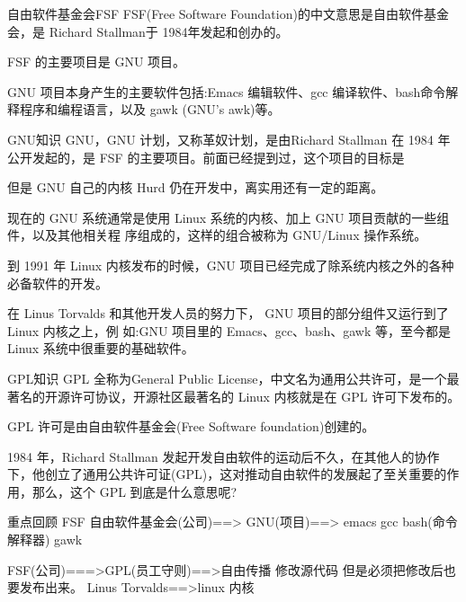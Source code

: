 \begin{ascboxD}{自由软件基金会FSF}
	FSF(Free Software Foundation)的中文意思是自由软件基金会，是 Richard Stallman于 1984年发起和创办的。
	
	FSF 的主要项目是 GNU 项目。
	
	GNU 项目本身产生的主要软件包括:Emacs 编辑软件、gcc 编译软件、bash命令解释程序和编程语言，以及 gawk (GNU’s awk)等。
\end{ascboxD}

\begin{ascboxD}{GNU知识}
	GNU，GNU 计划，又称革奴计划，是由Richard Stallman 在 1984 年公开发起的，是 FSF 的主要项目。前面已经提到过，这个项目的目标是
	
	但是 GNU 自己的内核 Hurd 仍在开发中，离实用还有一定的距离。
	
	现在的 GNU 系统通常是使用 Linux 系统的内核、加上 GNU 项目贡献的一些组件，以及其他相关程 序组成的，这样的组合被称为 GNU/Linux 操作系统。
	
	到 1991 年 Linux 内核发布的时候，GNU 项目已经完成了除系统内核之外的各种必备软件的开发。
	
	在 Linus Torvalds 和其他开发人员的努力下， GNU 项目的部分组件又运行到了 Linux 内核之上，例 如:GNU 项目里的 Emacs、gcc、bash、gawk 等，至今都是 Linux 系统中很重要的基础软件。
\end{ascboxD}

\begin{ascboxD}{GPL知识}
	GPL 全称为General Public License，中文名为通用公共许可，是一个最著名的开源许可协议，开源社区最著名的 Linux 内核就是在 GPL 许可下发布的。
	
	GPL 许可是由自由软件基金会(Free Software foundation)创建的。
	
	1984 年，Richard Stallman 发起开发自由软件的运动后不久，在其他人的协作下，他创立了通用公共许可证(GPL)，这对推动自由软件的发展起了至关重要的作用，那么，这个 GPL 到底是什么意思呢?
	
\end{ascboxD}


\begin{ascboxD}{重点回顾}
	FSF 自由软件基金会(公司)==> GNU(项目)==> emacs gcc bash(命令解释器) gawk
	
	FSF(公司)===>GPL(员工守则)==>自由传播 修改源代码 但是必须把修改后也要发布出来。
	Linus Torvalds==>linux 内核
	
\end{ascboxD}

